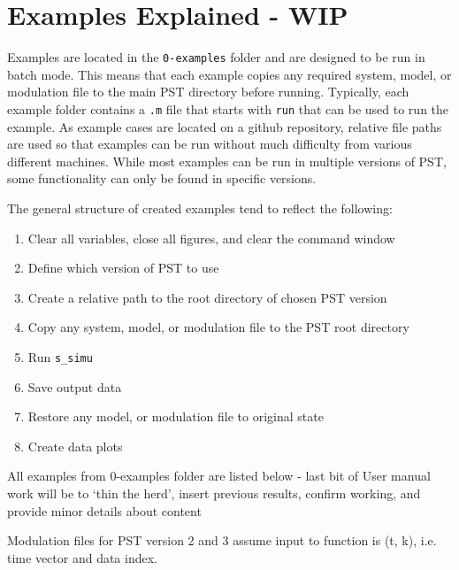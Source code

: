 \chapter{Examples Explained - WIP}
Examples are located in the \verb|0-examples| folder and are designed to be run in batch mode.
This means that each example copies any required system, model, or modulation file to the main PST directory before running.
Typically, each example folder contains a \verb|.m| file that starts with \verb|run| that can be used to run the example.
As example cases are located on a github repository, relative file paths are used so that examples can be run without much difficulty from various different machines.
While most examples can be run in multiple versions of PST, some functionality can only be found in specific versions.

\noindent The general structure of created examples tend to reflect the following:
\begin{enumerate}
\itemsep 0em
\item Clear all variables, close all figures, and clear the command window
\item Define which version of PST to use
\item Create a relative path to the root directory of chosen PST version
\item Copy any system, model, or modulation file to the PST root directory
\item Run \verb|s_simu|
\item Save output data
\item Restore any model, or modulation file to original state
\item Create data plots
\end{enumerate}








\pagebreak
All examples from 0-examples folder are listed below - last bit of User manual work will be to `thin the herd', insert previous results, confirm working, and provide minor details about content

Modulation files for PST version 2 and 3 assume input to function is (t, k), i.e. time vector and data index.


